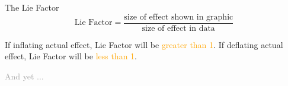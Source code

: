 \documentclass[
  ignorenonframetext,
]{beamer}
\begin{document}
\begin{frame}{}
\label{section-3}
\end{frame}

\begin{frame}{The Lie Factor}
\label{the-lie-factor}
\begin{equation*}
\text{Lie Factor} = \frac{\text{size of effect shown in graphic}}{\text{size of effect in data}}
\end{equation*}

If inflating actual effect, Lie Factor will be
\textcolor{orange}{greater than 1}. If deflating actual effect, Lie
Factor will be \textcolor{orange}{less than 1}.
\end{frame}

\begin{frame}{}
\label{section-4}
\centering

\huge \textcolor{darkgray}{And yet ...}
\end{frame}

\begin{frame}{}
\label{section-5}
\end{frame}
\end{document}
